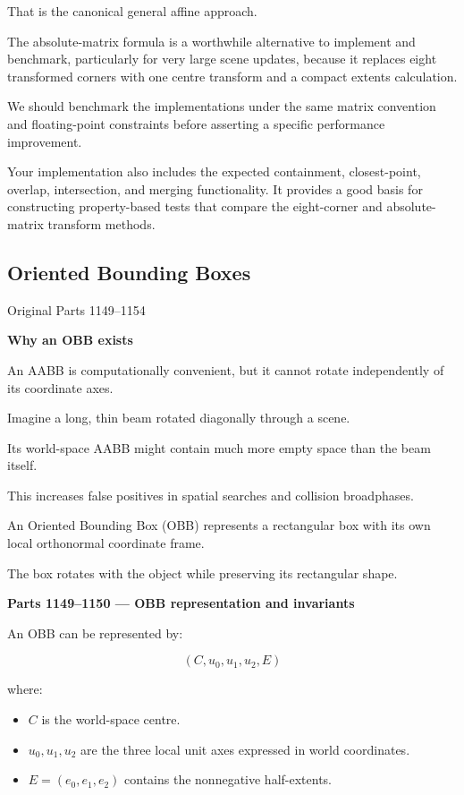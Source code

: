 That is the canonical general affine approach.

The absolute-matrix formula is a worthwhile alternative to implement and benchmark, particularly for very large scene updates, because it replaces eight transformed corners with one centre transform and a compact extents calculation.

We should benchmark the implementations under the same matrix convention and floating-point constraints before asserting a specific performance improvement.

Your implementation also includes the expected containment, closest-point, overlap, intersection, and merging functionality. It provides a good basis for constructing property-based tests that compare the eight-corner and absolute-matrix transform methods.

\subsection{Oriented Bounding Boxes}\label{03-visual-computing-i-ch021-oriented-bounding-boxes}

\hypertarget{03-visual-computing-i-ch021-oriented-bounding-boxes}{}

Original Parts 1149--1154

\textbf{Why an OBB exists}

An AABB is computationally convenient, but it cannot rotate independently of its coordinate axes.

Imagine a long, thin beam rotated diagonally through a scene.

Its world-space AABB might contain much more empty space than the beam itself.

This increases false positives in spatial searches and collision broadphases.

An Oriented Bounding Box (OBB) represents a rectangular box with its own local orthonormal coordinate frame.

The box rotates with the object while preserving its rectangular shape.

\textbf{Parts 1149--1150 --- OBB representation and invariants}

An OBB can be represented by:

\[
(C,u_0,u_1,u_2,E)
\]

where:

\begin{itemize}
\tightlist
\item
  \(C\) is the world-space centre.
\item
  \(u_0,u_1,u_2\) are the three local unit axes expressed in world coordinates.
\item
  \(E=(e_0,e_1,e_2)\) contains the nonnegative half-extents.
\end{itemize}

